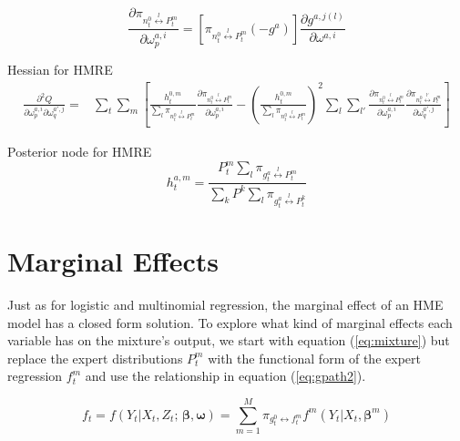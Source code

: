 \documentclass[12pt]{article}
\newcommand{\gateprod}[2]{\pi_{#1 \longleftrightarrow #2}}
\newcommand{\sumgateprod}[3]{\pi_{#1 \overset{#3}{\longleftrightarrow} #2}}
\newcommand{\shortsum}[1]{\sum \nolimits_{#1}}
\begin{document}
\begin{equation} \label{eq:gatechainpartial}
  \frac{\partial \pi_{n^{0}_{t} \overset{l}{\longleftrightarrow} P^{m}_{t}}}{\partial \omega^{a,i}_{p}} = [\pi_{n^{0}_{t} \overset{l}{\longleftrightarrow} P^{m}_{t}} (-g^{a})] \frac{\partial g^{a, j(l)}}{\partial \omega^{a, i}}
\end{equation}



Hessian for HMRE
\begin{equation}
  \begin{split}
    \frac{\partial^{2} Q}{\partial \omega^{a,i}_{p} \partial \omega^{a',j}_{q}} =& \sum_{t} \sum_{m} \left[  \frac{h^{0,m}_{t}}{\sum_{l} \pi_{n^{0}_{t} \overset{l}{\longleftrightarrow} P^{m}_{t}}} \frac{\partial \pi_{n^{0}_{t} \overset{l}{\longleftrightarrow} P^{m}_{t}}}{\partial \omega^{a,i}_{p}} - \left( \frac{h^{0,m}_{t}}{\sum_{l} \pi_{n^{0}_{t} \overset{l}{\longleftrightarrow} P^{m}_{t}}} \right)^{2} \sum_{l} \sum_{l'} \frac{\partial \pi_{n^{0}_{t} \overset{l}{\longleftrightarrow} P^{m}_{t}}}{\partial \omega^{a,i}_{p}}  \frac{\partial \pi_{n^{0}_{t} \overset{l'}{\longleftrightarrow} P^{m}_{t}}}{\partial \omega^{a',j}_{q}} \right]
  \end{split}
\end{equation}


Posterior node for HMRE
\begin{equation} 
  h^{a,m}_{t} = \frac{P^{m}_{t} \shortsum{l} \sumgateprod{g^{a}_{t}}{P^{m}_{t}}{l}}{\sum_{k} P^{k} \shortsum{l} \sumgateprod{g^{a}_{t}}{P^{k}_{t}}{l}}
\end{equation}




\section{Marginal Effects} \label{subsec:MarginalEffects}

Just as for logistic and multinomial regression, the marginal effect of an
HME model has a closed form solution. To explore what
kind of marginal effects each variable has on the mixture's 
output, we start with equation (\ref{eq:mixture}) but replace the
expert distributions $P^{m}_{t}$ with the functional form of the 
expert regression $f^{m}_{t}$ and use the relationship in equation
(\ref{eq:gpath2}). 

\begin{equation} \label{eq:mixture2}
  f_{t} = f(Y_{t} | X_{t}, Z_{t}; \, \boldsymbol{\beta}, \boldsymbol{\omega}) = \sum_{m=1}^{M} \gateprod{g^{0}_{t}}{f^{m}_{t}} f^{m}(Y_{t} | X_{t}, \boldsymbol{\beta}^{m})
\end{equation}
\end{document}
